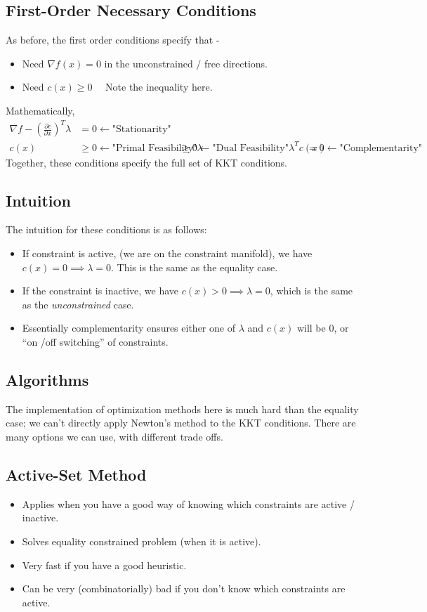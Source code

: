 \subsection{First-Order Necessary Conditions}
As before, the first order conditions specify that - 
\begin{itemize}
    \item Need $\nabla f(x) = 0$ in the unconstrained / free directions. 
    \item Need $c(x) \geq 0$ \ \ \textrm{Note the inequality here.}
\end{itemize}
Mathematically, 
\begin{align}
    \nabla f - (\frac{\partial c}{\partial x})^T \lambda &= 0 \gets \textrm{"Stationarity"} \\
    c(x) &\geq 0 \gets \textrm{"Primal Feasibility"}
    \lambda &\geq 0 \gets \textrm{"Dual Feasibility"}
    \lambda^T c(x) &= 0 \gets \textrm{"Complementarity"}
\end{align}
Together, these conditions specify the full set of KKT conditions. 

\subsection{Intuition}
The intuition for these conditions is as follows: 
\begin{itemize}
    \item If constraint is active, (we are on the constraint manifold), we have $c(x) = 0 \implies \lambda = 0$. This is the same as the equality case. 
    \item If the constraint is inactive, we have $c(x)>0 \implies \lambda = 0$, which is the same as the \textit{unconstrained} case. 
    \item Essentially complementarity ensures either one of $\lambda$ and $c(x)$ will be $0$, or ``on /off switching'' of constraints.
\end{itemize}

\subsection{Algorithms}
The implementation of optimization methods here is much hard than the equality case; we can't directly apply Newton's method to the KKT conditions. There are many options we can use, with different trade offs. 

\subsection{Active-Set Method}
\begin{itemize}
    \item Applies when you have a good way of knowing which constraints are active / inactive.
    \item Solves equality constrained problem (when it is active). 
    \item Very fast if you have a good heuristic. 
    \item Can be very (combinatorially) bad if you don't know which constraints are active. 
\end{itemize}

